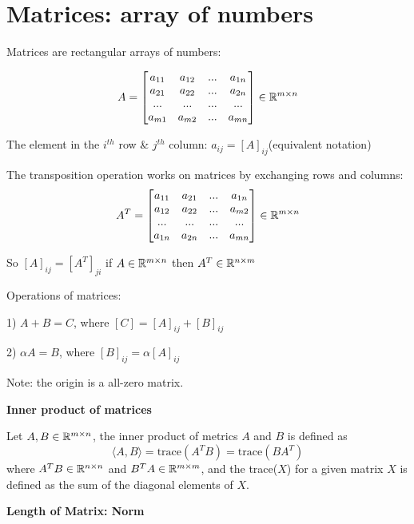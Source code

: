 \section{Matrices: array of numbers}





Matrices are rectangular arrays of numbers:

$$
A = 
\left[
\begin{matrix}
a_{11} & a_{12} & ... & a_{1n} \\
a_{21} & a_{22} & ... & a_{2n} \\
... & ... & ... & ...\\
a_{m1} & a_{m2} & ... & a_{mn}
\end{matrix}
\right] \in \mathbb{R}^{m\times n}
$$


The element in the $i^{th}$ row \& $j^{th}$ column: $a_{ij} = [A]_{ij}$(equivalent notation)

The transposition operation works on matrices by exchanging rows and columns: 
$$
A^T = 
\left[
\begin{matrix}
a_{11} & a_{21} & ... & a_{1n} \\
a_{12} & a_{22} & ... & a_{m2} \\
... & ... & ... & ...\\
a_{1n} & a_{2n} & ... & a_{mn}
\end{matrix}
\right] \in \mathbb{R}^{m\times n}
$$

So $[A]_{ij}  = [A^T]_{ji}$ if $A\in \mathbb{R}^{m\times n}$ then $A^T\in \mathbb{R}^{n\times m}$

Operations of matrices:

1) $A + B = C$,  where $[C] = [A]_{ij} + [B]_{ij}$

2) $\alpha A = B$, where $[B]_{ij} = \alpha [A]_{ij}$

Note: the origin is a all-zero matrix. 


\begin{definition}{\textbf{Inner product of matrices}} 
	
	Let $A, B\in\mathbb{R}^{m\times n}$, the inner product of metrics $A$ and $B$ is defined as
		$$\langle A, B\rangle = \text{trace}(A^TB) = \text{trace}(BA^T)$$ 
		where $A^TB\in \mathbb{R}^{n\times n}$ and $B^TA\in \mathbb{R}^{m\times m}$, and the trace($X$) for a given matrix $X$ is defined as the sum of the diagonal elements of $X$.
\end{definition}



\textbf{Length of Matrix: Norm}

